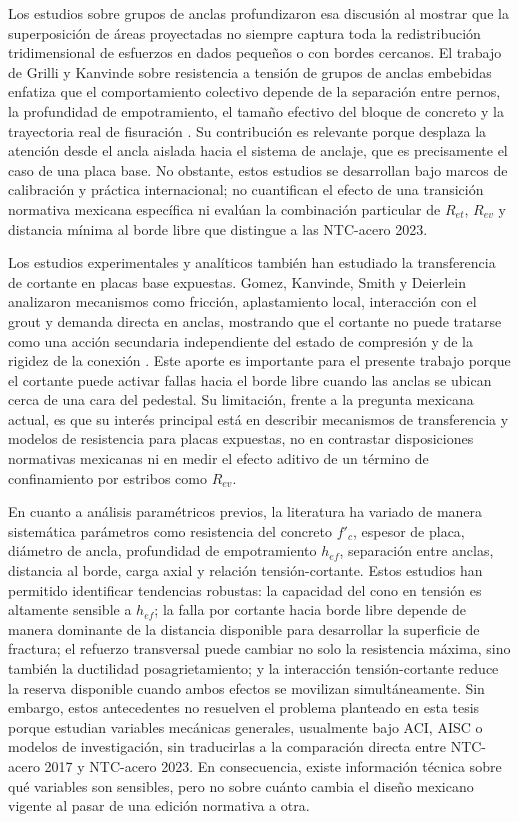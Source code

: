Los estudios sobre grupos de anclas profundizaron esa discusión al mostrar que la superposición de
áreas proyectadas no siempre captura toda la redistribución tridimensional de esfuerzos en dados
pequeños o con bordes cercanos. El trabajo de Grilli y Kanvinde sobre resistencia a tensión de
grupos de anclas embebidas enfatiza que el comportamiento colectivo depende de la separación entre
pernos, la profundidad de empotramiento, el tamaño efectivo del bloque de concreto y la trayectoria
real de fisuración \cite{Pankow_2017_anchor_groups}. Su contribución es relevante porque desplaza
la atención desde el ancla aislada hacia el sistema de anclaje, que es precisamente el caso de una
placa base. No obstante, estos estudios se desarrollan bajo marcos de calibración y práctica
internacional; no cuantifican el efecto de una transición normativa mexicana específica ni evalúan
la combinación particular de $R_{et}$, $R_{ev}$ y distancia mínima al borde libre que distingue a
las NTC-acero 2023.

Los estudios experimentales y analíticos también han estudiado la transferencia de cortante en placas
base expuestas. Gomez, Kanvinde, Smith y Deierlein analizaron mecanismos como fricción,
aplastamiento local, interacción con el grout y demanda directa en anclas, mostrando que el
cortante no puede tratarse como una acción secundaria independiente del estado de compresión y de
la rigidez de la conexión \cite{GomezKanvindeSmithDeierlein_2009}. Este aporte es importante para
el presente trabajo porque el cortante puede activar fallas hacia el borde libre cuando las anclas
se ubican cerca de una cara del pedestal. Su limitación, frente a la pregunta mexicana actual, es
que su interés principal está en describir mecanismos de transferencia y modelos de resistencia
para placas expuestas, no en contrastar disposiciones normativas mexicanas ni en medir el efecto
aditivo de un término de confinamiento por estribos como $R_{ev}$.

En cuanto a análisis paramétricos previos, la literatura ha variado de manera sistemática
parámetros como resistencia del concreto $f'_c$, espesor de placa, diámetro de ancla,
profundidad de empotramiento $h_{ef}$, separación entre anclas, distancia al borde, carga axial y
relación tensión-cortante. Estos estudios han permitido identificar tendencias robustas: la
capacidad del cono en tensión es altamente sensible a $h_{ef}$; la falla por cortante hacia borde
libre depende de manera dominante de la distancia disponible para desarrollar la superficie de
fractura; el refuerzo transversal puede cambiar no solo la resistencia máxima, sino también la
ductilidad posagrietamiento; y la interacción tensión-cortante reduce la reserva disponible cuando
ambos efectos se movilizan simultáneamente. Sin embargo, estos antecedentes no resuelven el
problema planteado en esta tesis porque estudian variables mecánicas generales, usualmente bajo
ACI, AISC o modelos de investigación, sin traducirlas a la comparación directa entre
NTC-acero 2017 y NTC-acero 2023. En consecuencia, existe información técnica sobre qué variables son
sensibles, pero no sobre cuánto cambia el diseño mexicano vigente al pasar de una edición
normativa a otra.

